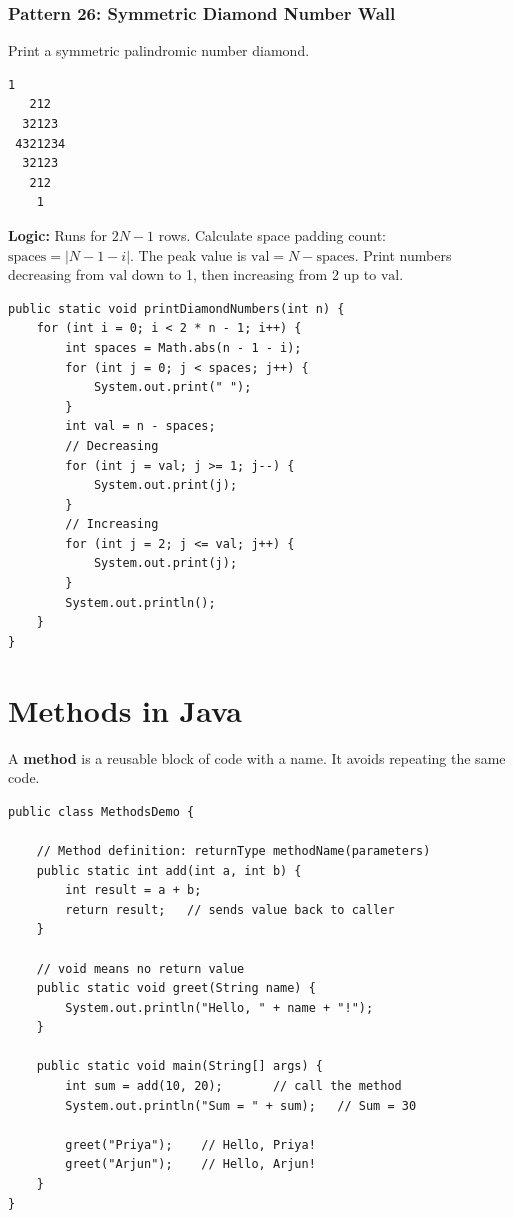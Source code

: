 \documentclass[12pt,a4paper,oneside]{book}
\begin{document}
\subsubsection{Pattern 26: Symmetric Diamond Number Wall}
Print a symmetric palindromic number diamond.
\begin{lstlisting}[frame=single]
    1
   212
  32123
 4321234
  32123
   212
    1
\end{lstlisting}
\textbf{Logic:} Runs for $2N-1$ rows. Calculate space padding count: $\text{spaces} = |N-1-i|$. The peak value is $\text{val} = N - \text{spaces}$. Print numbers decreasing from $\text{val}$ down to 1, then increasing from 2 up to $\text{val}$.
\begin{lstlisting}[caption={Symmetric Diamond Number Wall}]
public static void printDiamondNumbers(int n) {
    for (int i = 0; i < 2 * n - 1; i++) {
        int spaces = Math.abs(n - 1 - i);
        for (int j = 0; j < spaces; j++) {
            System.out.print(" ");
        }
        int val = n - spaces;
        // Decreasing
        for (int j = val; j >= 1; j--) {
            System.out.print(j);
        }
        // Increasing
        for (int j = 2; j <= val; j++) {
            System.out.print(j);
        }
        System.out.println();
    }
}
\end{lstlisting}


\section{Methods in Java}

A \textbf{method} is a reusable block of code with a name. It avoids repeating the same code.

\begin{lstlisting}[caption={Defining and calling methods}]
public class MethodsDemo {

    // Method definition: returnType methodName(parameters)
    public static int add(int a, int b) {
        int result = a + b;
        return result;   // sends value back to caller
    }

    // void means no return value
    public static void greet(String name) {
        System.out.println("Hello, " + name + "!");
    }

    public static void main(String[] args) {
        int sum = add(10, 20);       // call the method
        System.out.println("Sum = " + sum);   // Sum = 30

        greet("Priya");    // Hello, Priya!
        greet("Arjun");    // Hello, Arjun!
    }
}
\end{lstlisting}
\end{document}
